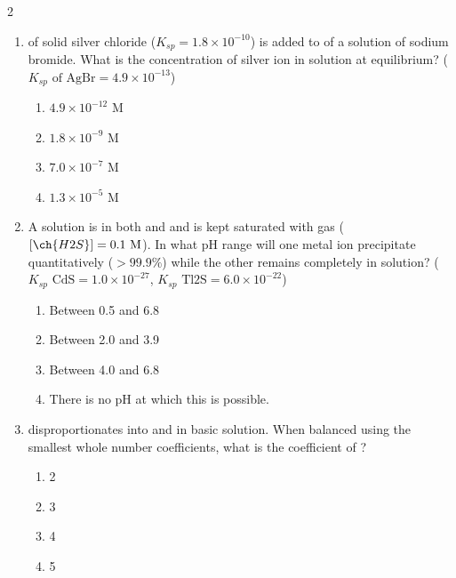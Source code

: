 \documentclass[10pt,letterpaper]{article}
\begin{document}
\begin{multicols*}{2}
\begin{enumerate}
    \item {} of solid silver chloride ($K_{sp} = 1.8 \times 10^{-10}$) is added to  of a  solution of sodium bromide. What is the concentration of silver ion in solution at equilibrium? ($K_{sp}\text{ of AgBr} = 4.9 \times 10^{-13}$)
    \begin{enumerate}[label=(\textsubscript{\Alph*})]
        \item $4.9 \times 10^{-12}\text{ M}$
        \item $1.8 \times 10^{-9}\text{ M}$
        \item $7.0 \times 10^{-7}\text{ M}$
        \item $1.3 \times 10^{-5}\text{ M}$
    \end{enumerate}

    \item A solution is  in both  and  and is kept saturated with  gas ($[\ch{H2S}] = 0.1\text{ M}$). In what pH range will one metal ion precipitate quantitatively ($>99.9\%$) while the other remains completely in solution? ($K_{sp}\text{ CdS} = 1.0 \times 10^{-27}$, $K_{sp}\text{ Tl2S} = 6.0 \times 10^{-22}$)
    \begin{enumerate}[label=(\textsubscript{\Alph*})]
        \item Between 0.5 and 6.8
        \item Between 2.0 and 3.9
        \item Between 4.0 and 6.8
        \item There is no pH at which this is possible.
    \end{enumerate}

    \item {} disproportionates into  and  in basic solution. When balanced using the smallest whole number coefficients, what is the coefficient of ?
    \begin{enumerate}[label=(\textsubscript{\Alph*})]
        \item 2
        \item 3
        \item 4
        \item 5
    \end{enumerate}


\end{enumerate}
\end{multicols*}
\end{document}
